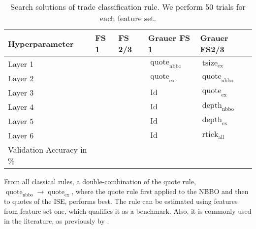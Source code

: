 \begin{table}[H]
    \centering
    \caption[Search Solutions of Trade Classification Rule]{Search solutions of trade classification rule. We perform \num{50} trials for each feature set.}
    \label{tab:solutions-classical-rules}
    \begin{tabular}{@{}lllll@{}}
        \toprule
        Hyperparameter            & FS 1 & FS 2/3 & Grauer FS 1                            & Grauer FS2/3                           \\ \midrule
        Layer 1                   &      &        & $\operatorname{quote}_{\mathrm{nbbo}}$ & $\operatorname{tsize}_{\mathrm{ex}}$   \\
        Layer 2                   &      &        & $\operatorname{quote}_{\mathrm{ex}}$   & $\operatorname{quote}_{\mathrm{nbbo}}$ \\
        Layer 3                   &      &        & $\operatorname{Id}$                    & $\operatorname{quote}_{\mathrm{ex}}$   \\
        Layer 4                   &      &        & $\operatorname{Id}$                    & $\operatorname{depth}_{\mathrm{nbbo}}$ \\
        Layer 5                   &      &        & $\operatorname{Id}$                    & $\operatorname{depth}_{\mathrm{ex}}$   \\
        Layer 6                   &      &        & $\operatorname{Id}$                    & $\operatorname{rtick}_{\mathrm{all}}$  \\ \midrule
        Validation Accuracy in \% &      &        &                                        &                                        \\ \bottomrule
    \end{tabular}
\end{table}

From all classical rules, a double-combination of the quote rule, $\operatorname{quote}_{\mathrm{nbbo}} \to \operatorname{quote}_{\mathrm{ex}}$, where the quote rule first applied to the \gls{NBBO} and then to quotes of the \gls{ISE}, performs best. The rule can be estimated using features from feature set one, which qualifies it as a benchmark. Also, it is commonly used in the literature, as previously by \textcite[][]{muravyevOptionsTradingCosts2020}.

